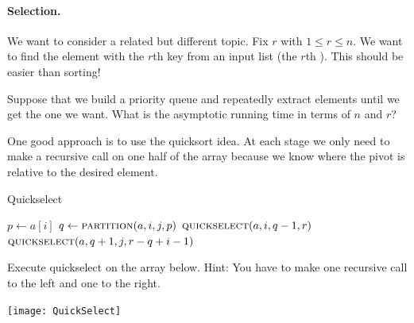 \paragraph{Selection.}
We want to consider a related but different topic. Fix $r$ with $1\leq r \leq n$. 
We want to find the element with the $r$th key from an input list (the $r$th ). 
This should be easier than sorting! 

\begin{Boxample}[5]
Suppose that we build a priority queue and repeatedly extract elements until we get the one we want.
What is the asymptotic running time in terms of $n$ and $r$?

\end{Boxample}

One good approach is to use the quicksort idea. At each stage we only need to 
make a recursive call on one half of the array because we know where the pivot 
is relative to the desired element. 


\begin{algorithm}[H]
  \caption{Quickselect
     \label{alg:quickselect}}
\begin{algorithmic}[0]
		\State $p \gets a[i]$ 
		\State $q \gets  \Call{partition}{a, i,j,p}$ 
			\State {}
			\State $\Call{quickselect}{a,i,q-1,r}$ 
		\Else{}
			\State $\Call{quickselect}{a,q+1,j,r-q+i-1}$ 
		\EndIf
	\EndIf
\EndFunction  
\end{algorithmic}
\end{algorithm}

\begin{Boxample}[1]
Execute quickselect on the array below. Hint: You have to make one recursive call to the left and one to the right.
\begin{center}
\texttt{[image: QuickSelect]} 
\end{center}
\end{Boxample}


